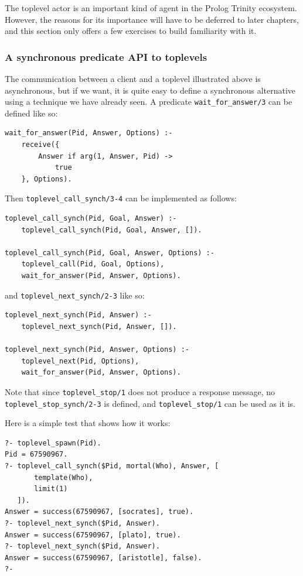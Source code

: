 The toplevel actor is an important kind of agent in the Prolog Trinity ecosystem. However, the reasons for its importance will have to be deferred to later chapters, and this section only offers a few exercises to build familiarity with it.

\subsubsection{A synchronous predicate API to toplevels}\label{sec:toplevel-sync-api}

The communication between a client and a toplevel illustrated above is asynchronous, but if we want, it is quite easy to define a synchronous alternative using a technique we have already seen. A predicate \texttt{wait\_for\_answer/3} can be defined like so:

\begin{verbatim}
wait_for_answer(Pid, Answer, Options) :-
    receive({
        Answer if arg(1, Answer, Pid) ->
            true 
    }, Options).	
\end{verbatim}

\noindent Then \texttt{toplevel\_call\_synch/3-4} can be implemented as follows:

\begin{verbatim}
toplevel_call_synch(Pid, Goal, Answer) :-
    toplevel_call_synch(Pid, Goal, Answer, []).

toplevel_call_synch(Pid, Goal, Answer, Options) :-
    toplevel_call(Pid, Goal, Options),
    wait_for_answer(Pid, Answer, Options).
\end{verbatim}

\noindent and \texttt{toplevel\_next\_synch/2-3} like so:

\begin{verbatim}
toplevel_next_synch(Pid, Answer) :-
    toplevel_next_synch(Pid, Answer, []).

toplevel_next_synch(Pid, Answer, Options) :-
    toplevel_next(Pid, Options),
    wait_for_answer(Pid, Answer, Options).
\end{verbatim}

\noindent Note that since \texttt{toplevel\_stop/1} does not produce a response message, no \texttt{toplevel\_stop\_synch/2-3} is defined, and \texttt{toplevel\_stop/1} can be used as it is.

Here is a simple test that shows how it works:

\begin{verbatim}
?- toplevel_spawn(Pid).
Pid = 67590967.
?- toplevel_call_synch($Pid, mortal(Who), Answer, [
       template(Who),
       limit(1)
   ]).
Answer = success(67590967, [socrates], true).
?- toplevel_next_synch($Pid, Answer).
Answer = success(67590967, [plato], true).
?- toplevel_next_synch($Pid, Answer).
Answer = success(67590967, [aristotle], false).
?- 
\end{verbatim}

